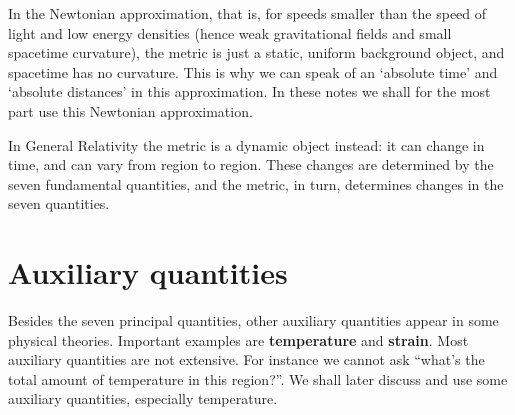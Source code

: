 \documentclass[a4paper,12pt,%
onecolumn,oneside,titlepage,%
british%
]{memoir}
\renewcommand*{\|}[1][]{\nonscript\:#1\vert\nonscript\:\mathopen{}}
\begin{document}
In the Newtonian approximation, that is, for speeds smaller than the speed of light and low energy densities (hence weak gravitational fields and small spacetime curvature), the metric is just a static, uniform background object, and spacetime has no curvature. This is why we can speak of an \enquote*{absolute time} and \enquote*{absolute distances} in this approximation. In these notes we shall for the most part use this Newtonian approximation.

In General Relativity the metric is a dynamic object instead: it can change in time, and can vary from region to region. These changes are determined by the seven fundamental quantities, and the metric, in turn, determines changes in the seven quantities.


\section{Auxiliary quantities}
\label{sec:aux_quantities}

Besides the seven principal quantities, other auxiliary quantities appear in some physical theories. Important examples are \textbf{temperature} and \textbf{strain}. Most auxiliary quantities are not extensive. For instance we cannot ask \enquote{what's the total amount of temperature in this region?}. We shall later discuss and use some auxiliary quantities, especially temperature.
\end{document}
